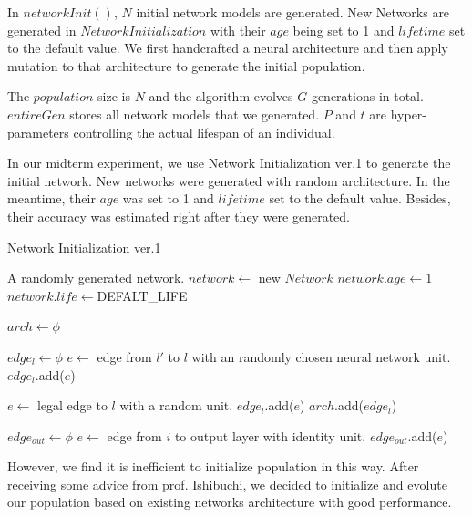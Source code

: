 \documentclass[conference]{IEEEtran}
\begin{document}
In $networkInit()$, $N$ initial network models are generated. New Networks are generated in $Network Initialization$ with their $age $ being set to 1 and $lifetime$ set to the default value. We first handcrafted a neural architecture and then apply mutation to that architecture to generate the initial population. 

The $population$ size is $N$ and the algorithm evolves $G$ generations in total. $entireGen$ stores all network models that we generated. $P$ and $t$ are hyper-parameters controlling the actual lifespan of an individual.
     

In our midterm experiment, we use Network Initialization ver.1 to generate the initial network. New networks were generated with random architecture. In the meantime, their $age $ was set to 1 and $lifetime$ set to the default value. Besides, their accuracy was estimated right after they were generated.
 \begin{algorithm}[H]  
    \caption{ Network Initialization ver.1}
    
    
    \begin{algorithmic}[1]  
        \Ensure A randomly generated network.
    \State $network\gets $ new $Network$
    \State $network.age\gets1$
    \State $network.life\gets $DEFALT\_LIFE 
    
    \State $arch\gets \phi$

    \State $edge_l \gets \phi$
    \State $e \gets$ edge from $l'$ to $l$ with an randomly chosen neural network unit.
    \State $edge_l$.add($e$)
    \EndIf
        \EndFor

        \State  $e \gets$ legal edge to $l$ with a random unit.
        \State $edge_l$.add($e$)
        \EndIf
    \State $arch$.add($edge_l$)
        \EndFor
    
    \State $edge_{out} \gets \phi$
      \State $e \gets$ edge from $i$ to output layer with identity unit.
      \State $edge_{out}$.add($e$)
    \EndFor
        
    \end{algorithmic}  
\end{algorithm}  


However, we find it is inefficient to initialize population in this way. After receiving some advice from prof. Ishibuchi, we decided to initialize and evolute our population based on existing networks architecture with good performance.
\end{document}
